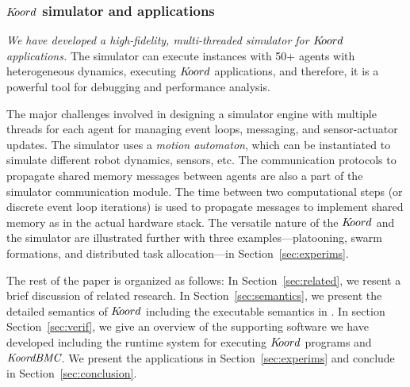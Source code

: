 \subsubsection{$K\kern-2pt oord$ simulator and applications}

{\em We have developed a high-fidelity, multi-threaded simulator for $K\kern-2pt oord$ applications.} The simulator can execute instances with 50+ agents with heterogeneous dynamics, executing $K\kern-2pt oord$ applications, and therefore, it is a powerful tool for debugging and performance analysis.  

The major challenges involved in designing a simulator  engine with multiple threads for each agent for managing event loops, messaging, and sensor-actuator updates. 
The simulator uses a {\em motion automaton\/}, which can be instantiated to simulate different robot dynamics, sensors, etc. The communication protocols to propagate shared memory messages between agents are also a part of the simulator communication module. The time between two computational steps (or discrete event loop iterations) is used to propagate messages to implement shared memory as in the actual hardware stack. 
The versatile nature of the $K\kern-2pt oord$ and the simulator are illustrated further with three examples---platooning,  swarm formations, and distributed task allocation---in Section~\ref{sec:experims}.

The rest of the paper is organized as follows:
In Section~\ref{sec:related}, we resent a brief discussion of related research. In Section~\ref{sec:semantics}, we present the detailed semantics of $K\kern-2pt oord$ including the executable semantics in \K. In section Section~\ref{sec:verif}, we give an overview of the supporting software we have developed including the runtime system for executing $K\kern-2pt oord$ programs and $\emph{KoordBMC}$. We present the applications in Section~\ref{sec:experims} and conclude in Section~\ref{sec:conclusion}.







